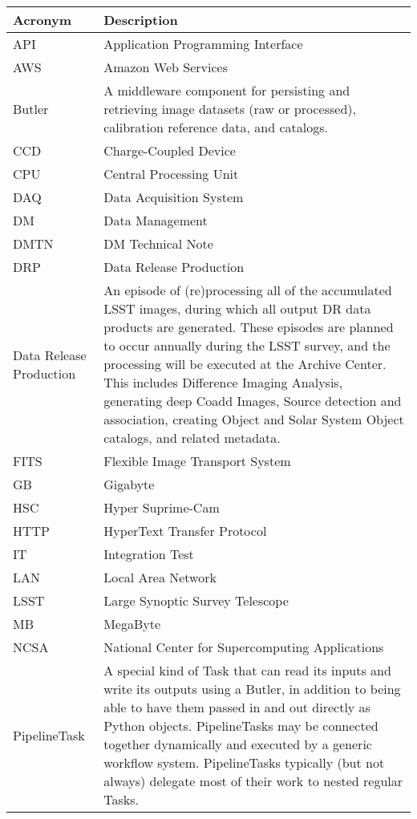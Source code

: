\addtocounter{table}{-1}
\begin{longtable}{|p{}|p{}|}\hline
\textbf{Acronym} & \textbf{Description}  \\\hline

API & Application Programming Interface \\\hline
AWS & Amazon Web Services \\\hline
Butler & A middleware component for persisting and retrieving image datasets (raw or processed), calibration reference data, and catalogs. \\\hline
CCD & Charge-Coupled Device \\\hline
CPU & Central Processing Unit \\\hline
DAQ & Data Acquisition System \\\hline
DM & Data Management \\\hline
DMTN & DM Technical Note \\\hline
DRP & Data Release Production \\\hline
Data Release Production & An episode of (re)processing all of the accumulated LSST images, during which all output DR data products are generated. These episodes are planned to occur annually during the LSST survey, and the processing will be executed at the Archive Center. This includes Difference Imaging Analysis, generating deep Coadd Images, Source detection and association, creating Object and Solar System Object catalogs, and related metadata. \\\hline
FITS & Flexible Image Transport System \\\hline
GB & Gigabyte \\\hline
HSC & Hyper Suprime-Cam \\\hline
HTTP & HyperText Transfer Protocol \\\hline
IT & Integration Test \\\hline
LAN & Local Area Network \\\hline
LSST & Large Synoptic Survey Telescope \\\hline
MB & MegaByte \\\hline
NCSA & National Center for Supercomputing Applications \\\hline
PipelineTask & A special kind of Task that can read its inputs and write its outputs using a Butler, in addition to being able to have them passed in and out directly as Python objects. PipelineTasks may be connected together dynamically and executed by a generic workflow system. PipelineTasks typically (but not always) delegate most of their work to nested regular Tasks. \\\hline

\end{longtable}
